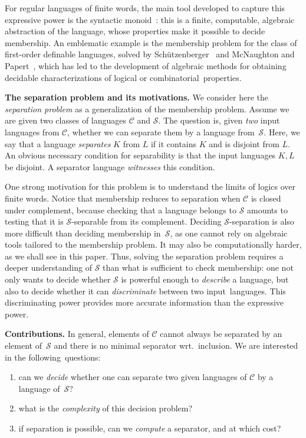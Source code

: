 \documentclass{LMCS}
\newcommand\mypar[1]{\par\medskip\noindent\textbf{#1}}
\newcommand\Sep{\ensuremath{\mathcal{S}}\xspace}
\newcommand\C{\ensuremath{\mathcal{C}}\xspace}
\theoremstyle{plain}
\begin{document}
For regular languages of finite words, the main tool developed to
capture this expressive power is the syntactic
monoid~\cite{pin:hal-00143946}: this is a finite, computable, algebraic
abstraction of the language, whose properties make it possible to
decide  membership. An emblematic example is the membership problem
for the class of first-order definable languages, solved by
Sch\"utzenberger~\cite{Schutzenberger:finite-monoids-having-only:1965:a}
and McNaughton and Papert~\cite{mcnaughton&papert:1971:counter}, which
has led to the development of algebraic methods for obtaining
decidable characterizations of logical
or combinatorial~properties.

\mypar{The separation problem and its motivations.} We consider here the
\emph{separation problem} as a generalization of the membership problem.
Assume we are given two classes of languages $\C$ and \Sep. The
question is, given \emph{two} input languages from $\C$, 
 whether we can separate them by a language from~\Sep. Here, we say
that a language \emph{separates} $K$ from $L$ if it contains $K$ and
is disjoint from $L$.  An obvious necessary condition for separability
is that the input languages $K,L$ be disjoint. A separator language
\emph{witnesses} this condition.

\smallskip
One strong motivation for this problem is to understand the limits of
logics over finite words. Notice that membership reduces to separation
when \C is closed under complement, because checking that a language
belongs to \Sep amounts to testing that it is \Sep-separable from its
complement. Deciding \Sep-separation is also more difficult than
deciding membership in~\Sep, as one cannot rely on algebraic tools
tailored to the membership problem. It may also be computationally
harder, as we shall see in this paper. Thus, solving the separation
problem requires a deeper understanding of \Sep than what is
sufficient to check membership: one not only wants to decide whether
\Sep is powerful enough to \emph{describe} a language, but also to
decide whether it can \emph{discriminate} between two
input~languages. This discriminating power provides more accurate
information than the expressive power.

\mypar{Contributions.}  In general, elements of $\C$ cannot always be
separated by an element of~$\Sep$ and there is no minimal separator wrt.\  inclusion. We
are interested in the following~questions:
\begin{enumerate}[label=\({\alph*}]
\item can we \emph{decide} whether one can separate two given
  languages of $\C$ by a language of~$\Sep$?
\item what is the \emph{complexity} of this decision problem?
\item if separation is possible, can we \emph{compute} a separator, and at
  which cost?
\end{enumerate}
\end{document}
